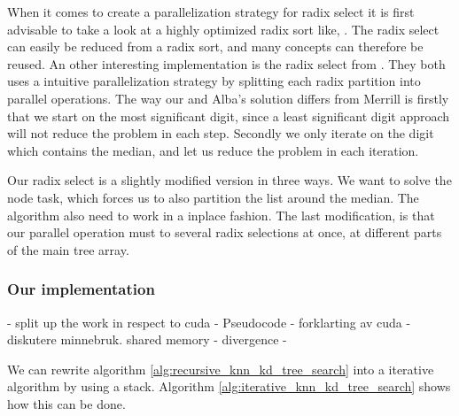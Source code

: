 When it comes to create a parallelization strategy for radix select it is first advisable to take a look at a highly optimized radix sort like, \citep{MerrillG11}. The radix select can easily be reduced from a radix sort, and many concepts can therefore be reused. An other interesting implementation is the radix select from \citep{Alabi:2012}. They both uses a intuitive parallelization strategy by splitting each radix partition into parallel operations. The way our and Alba's solution differs from Merrill is firstly that we start on the most significant digit, since a least significant digit approach will not reduce the problem in each step. Secondly we only iterate on the digit which contains the median, and let us reduce the problem in each iteration.

Our radix select is a slightly modified version in three ways. We want to solve the node task, which forces us to also partition the list around the median. The algorithm also need to work in a inplace fashion. The last modification, is that our parallel operation must to several radix selections at once, at different parts of the main tree array.


\subsubsection{Our implementation} %
\label{ssub:our_implementation}


- split up the work in respect to cuda
- Pseudocode
- forklarting av cuda
- diskutere minnebruk. shared memory
- divergence
-





We can rewrite algorithm \ref{alg:recursive_knn_kd_tree_search} into a iterative algorithm by using a stack. Algorithm \ref{alg:iterative_knn_kd_tree_search} shows how this can be done.

